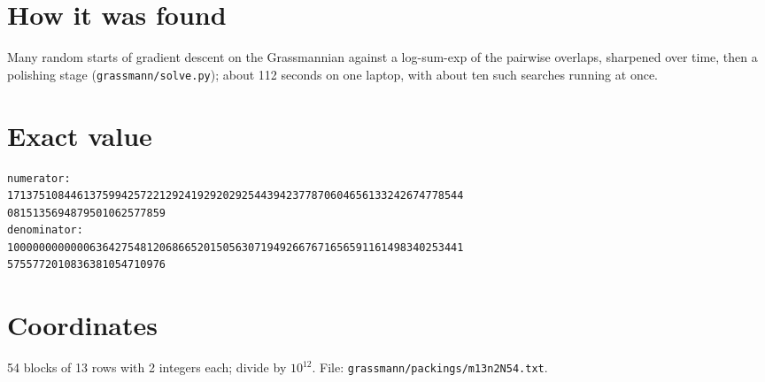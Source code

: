 \documentclass[11pt,a4paper]{article}
\begin{document}
\section{How it was found}
Many random starts of gradient descent on the Grassmannian against a log-sum-exp of the pairwise overlaps, sharpened over time, then a polishing stage (\texttt{grassmann/solve.py}); about 112 seconds on one laptop, with about ten such searches running at once.


\appendix
\section{Exact value}
{\small
\begin{verbatim}
numerator:
171375108446137599425722129241929202925443942377870604656133242674778544
0815135694879501062577859
denominator:
100000000000063642754812068665201505630719492667671656591161498340253441
5755772010836381054710976
\end{verbatim}}

\section{Coordinates}
54 blocks of 13 rows with 2 integers each; divide by $10^{12}$. File: \texttt{grassmann/packings/m13n2N54.txt}.
{\tiny
\begin{multicols}{4}
\end{multicols}}
\end{document}
